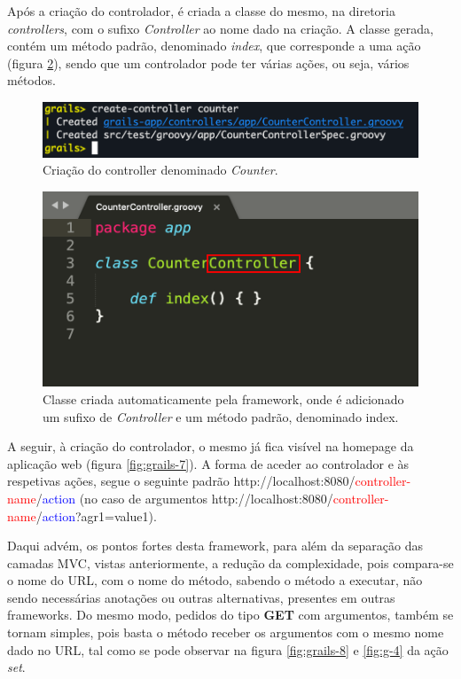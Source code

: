 \hspace{5mm} Após a criação do controlador, é criada a classe do mesmo, na diretoria \textit{controllers}, com o sufixo \textit{Controller} ao nome dado na criação. A classe gerada, contém um método padrão, denominado \textit{index}, que corresponde a uma ação (figura \ref{fig:grails-5}), sendo que um controlador pode ter várias ações, ou seja, vários métodos.  

\begin{figure}[H]
    \centering
    \includegraphics[scale=0.50]{images/grails-4.png}
    \caption{Criação do controller denominado \textit{Counter}.}
    \label{fig:grails-4}
\end{figure}

\begin{figure}[H]
    \centering
    \includegraphics[scale=0.50]{images/grails-5.png}
    \caption{Classe criada automaticamente pela framework, onde é adicionado um sufixo de \textit{Controller} e um método padrão, denominado index.}
    \label{fig:grails-5}
\end{figure}

\hspace{5mm} A seguir, à criação do controlador, o mesmo já fica visível na homepage da aplicação web (figura \ref{fig:grails-7}). A forma de aceder ao controlador e às respetivas ações, segue o seguinte padrão http://localhost:8080/\textcolor{red}{controller-name}/\textcolor{blue}{action} (no caso de argumentos http://localhost:8080/\textcolor{red}{controller-name}/\textcolor{blue}{action}?agr1=value1).

\hspace{5mm} Daqui advém, os pontos fortes desta framework, para além da separação das camadas MVC, vistas anteriormente, a redução da complexidade, pois compara-se o nome do URL, com o nome do método, sabendo o método a executar, não sendo necessárias anotações ou outras alternativas, presentes em outras frameworks. Do mesmo modo, pedidos do tipo \textbf{GET} com argumentos, também se tornam simples, pois basta o método receber os argumentos com o mesmo nome dado no URL, tal como se pode observar na figura \ref{fig:grails-8} e \ref{fig:g-4} da ação \textit{set}.


